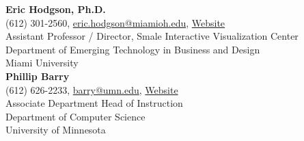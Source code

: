 \textbf{Eric Hodgson, Ph.D.}\\
\hspace*{0.25cm}\faPhone\hspace*{0.1cm}(612) 301-2560,\hspace*{0.2cm} \faEnvelopeO\hspace*{0.1cm}\href{mailto://eric.hodgson@miamioh.edu}{eric.hodgson@miamioh.edu}, \faLink\hspace*{0.1cm}\href{https://www.miamioh.edu/cca/academics/departments/etbd/about/our-people/faculty/eric-hodgson/index.html}{Website}\\
\hspace*{0.25cm} Assistant Professor / Director, Smale Interactive Visualization Center\\
\hspace*{0.25cm} Department of Emerging Technology in Business and Design\\
\hspace*{0.25cm} Miami University\\



\textbf{Phillip Barry}\\
\hspace*{0.25cm}\faPhone\hspace*{0.1cm}(612) 626-2233,\hspace*{0.2cm} \faEnvelopeO\hspace*{0.1cm}\href{mailto://barry@umn.edu}{barry@umn.edu}, \faLink\hspace*{0.1cm}\href{https://www-users.cs.umn.edu/~barry/}{Website}\\
\hspace*{0.25cm} Associate Department Head of Instruction\\
\hspace*{0.25cm} Department of Computer Science\\
\hspace*{0.25cm} University of Minnesota\\

\label{references_last}


